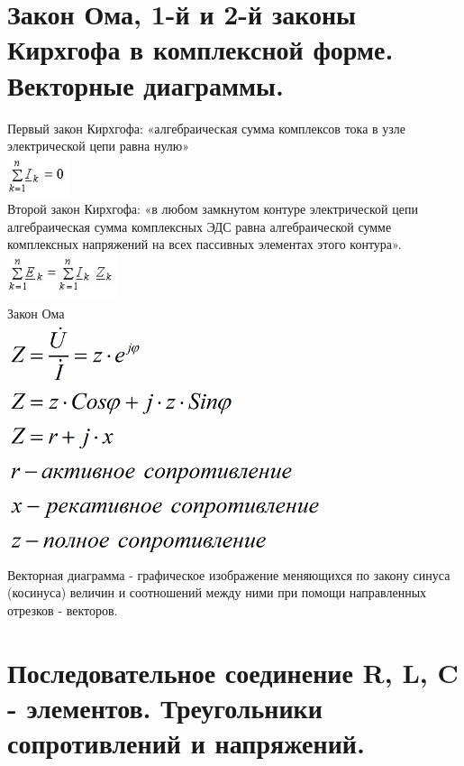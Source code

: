 \documentclass[a4paper, 12pt]{article}
\begin{document}
\section{Закон Ома, 1-й и 2-й законы Кирхгофа в комплексной форме. Векторные диаграммы.}
Первый закон Кирхгофа: «алгебраическая сумма комплексов тока в узле электрической цепи равна нулю» \\
\includegraphics{30-1.png}\\
Второй закон Кирхгофа: «в любом замкнутом контуре электрической цепи алгебраическая сумма комплексных ЭДС равна алгебраической сумме комплексных напряжений на всех пассивных элементах этого контура». \\
\includegraphics{30-2.png}\\

Закон Ома\\
\includegraphics{30-3.png}\\

Векторная диаграмма - графическое изображение меняющихся по закону синуса (косинуса) величин и соотношений между ними при помощи направленных отрезков - векторов.
\section{Последовательное соединение R, L, C - элементов. Треугольники сопротивлений и напряжений.}
\section{}
\end{document}
